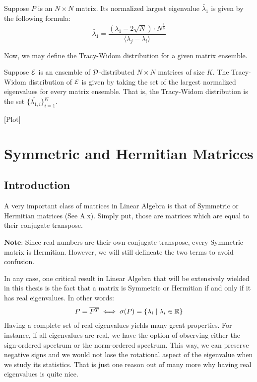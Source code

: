 \begin{definition}
Suppose $P$ is an $N \times N$ matrix. Its normalized largest eigenvalue $\widetilde{\lambda_1}$ is given by the following formula:
$$\widetilde{\lambda_1} = \frac{(\lambda_1 - 2\sqrt{N})\cdot N^{\frac{1}{6}}}{\langle \lambda_j - \lambda_i \rangle}$$
\end{definition}

Now, we may define the Tracy-Widom distribution for a given matrix ensemble.

\begin{definition}
Suppose $\mathcal{E}$ is an ensemble of $\mathcal{D}$-distributed $N \times N$ matrices of size $K$. The Tracy-Widom distribution of $\mathcal{E}$ is given by taking the set of the largest normalized eigenvalues for every matrix ensemble. That is, the Tracy-Widom distribution is the set $\{ \widetilde{\lambda_{1,i}}\}_{i=1}^K$.
\end{definition}

\begin{center}
[Plot]
\end{center}


\section{Symmetric and Hermitian Matrices}

\subsection{Introduction}

A very important class of matrices in Linear Algebra is that of Symmetric or Hermitian matrices (See A.x). Simply put, those are matrices which are equal to their conjugate transpose. 

$\textbf{Note:}$ Since real numbers are their own conjugate transpose, every Symmetric matrix is Hermitian. However, we will still delineate the two terms to avoid confusion.

In any case, one critical result in Linear Algebra that will be extensively wielded in this thesis is the fact that a matrix is Symmetric or Hermitian if and only if it has real eigenvalues. In other words:
\begin{align*}
P = \overline{P^{T}} \iff \sigma(P) = \{\lambda_i \mid \lambda_i \in \mathbb{R}\}
\end{align*}
Having a complete set of real eigenvalues yields many great properties. For instance, if all eigenvalues are real, we have the option of observing either the sign-ordered spectrum or the norm-ordered spectrum. This way, we can preserve negative signs and we would not lose the rotational aspect of the eigenvalue when we study its statistics. That is just one reason out of many more why having real eigenvalues is quite nice.

